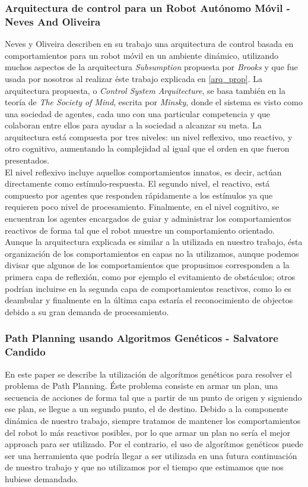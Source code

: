 \subsubsection{Arquitectura de control para un Robot Aut\'onomo M\'ovil - Neves And Oliveira \cite{Neves97acontrol}}
Neves y Oliveira describen en su trabajo una arquitectura de control basada en comportamientos para un
robot m\'ovil en un ambiente din\'amico, utilizando muchos aspectos de la arquitectura \emph{Subsumption} propuesta
por \emph{Brooks} y que fue usada por nosotros al realizar \'este trabajo explicada en \ref{arq_prop}.
La arquitectura propuesta, o \emph{Control System Arquitecture}, se basa tambi\'en en la teor\'ia de
\emph{The Society of Mind}, escrita por \emph{Minsky}, donde el sistema es visto como una sociedad de agentes,
cada uno con una particular competencia y que colaboran entre ellos para ayudar a la sociedad a alcanzar
su meta.
La arquitectura est\'a compuesta por tres niveles: un nivel reflexivo, uno reactivo, y otro cognitivo, aumentando
la complejidad al igual que el orden en que fueron presentados.
\\
El nivel reflexivo incluye aquellos comportamientos
innatos, es decir, act\'uan directamente como est\'imulo-respuesta. El segundo nivel, el reactivo, est\'a
compuesto por agentes que responden r\'apidamente a los est\'imulos ya que requieren poco nivel de procesamiento.
Finalmente, en el nivel cognitivo, se encuentran los agentes encargados de guiar y administrar los comportamientos
reactivos de forma tal que el robot muestre un comportamiento orientado.
\\
Aunque la arquitectura explicada es similar a la utilizada en nuestro trabajo, \'esta organizaci\'on de los
comportamientos en capas no la utilizamos, aunque podemos divisar que algunos de los comportamientos que propusimos
corresponden a la primera capa de reflexi\'on, como por ejemplo el evitamiento de
obst\'aculos; otros podr\'ian incluirse en la segunda capa de comportamientos reactivos, como lo es deambular y
finalmente en la \'ultima capa estar\'ia el reconocimiento de objectos debido a su gran demanda de procesamiento.

\subsubsection{Path Planning usando Algoritmos Gen\'eticos - Salvatore Candido \cite{salvatore}}
En este paper se describe la utilizaci\'on de algor\'itmos gen\'eticos para resolver el problema de Path Planning.
\'Este problema consiste en armar un plan, una secuencia de acciones de forma tal que a partir de un punto de origen y siguiendo
ese plan, se llegue a un segundo punto, el de destino. Debido a la componente din\'amica de nuestro trabajo, siempre
tratamos de mantener los comportamientos del robot lo m\'as reactivos posibles, por lo que armar un plan no 
ser\'ia el mejor approach para ser utilizado. Por el contrario, el uso de algor\'itmos gen\'eticos puede ser
una herramienta que podr\'ia llegar a ser utilizada en una futura continuaci\'on de nuestro trabajo y que no
utilizamos por el tiempo que estimamos que nos hubiese demandado.

